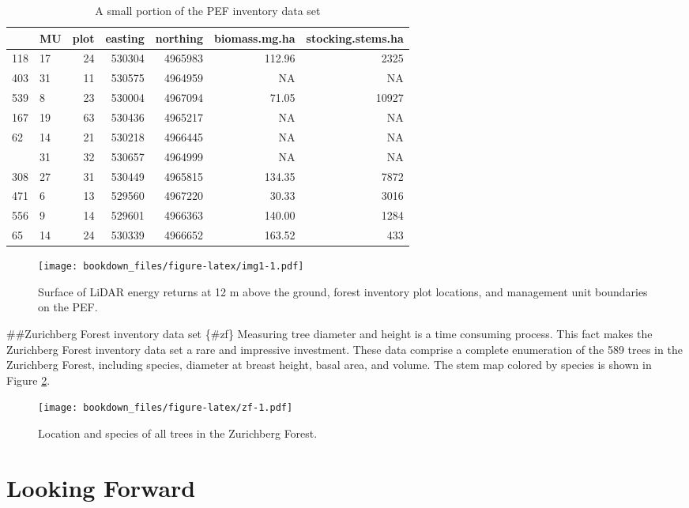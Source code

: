 \documentclass[]{krantz}
\begin{document}
\begin{table}[t]

\caption{\label{tab:pef}A small portion of the PEF inventory data set}
\centering
\begin{tabular}{llrrrrr}
\toprule
  & MU & plot & easting & northing & biomass.mg.ha & stocking.stems.ha\\
\midrule
118 & 17 & 24 & 530304 & 4965983 & 112.96 & 2325\\
403 & 31 & 11 & 530575 & 4964959 & NA & NA\\
539 & 8 & 23 & 530004 & 4967094 & 71.05 & 10927\\
167 & 19 & 63 & 530436 & 4965217 & NA & NA\\
62 & 14 & 21 & 530218 & 4966445 & NA & NA\\
\addlinespace
410 & 31 & 32 & 530657 & 4964999 & NA & NA\\
308 & 27 & 31 & 530449 & 4965815 & 134.35 & 7872\\
471 & 6 & 13 & 529560 & 4967220 & 30.33 & 3016\\
556 & 9 & 14 & 529601 & 4966363 & 140.00 & 1284\\
65 & 14 & 24 & 530339 & 4966652 & 163.52 & 433\\
\bottomrule
\end{tabular}
\end{table}

\begin{figure}
\centering
\texttt{[image: bookdown\_files/figure-latex/img1-1.pdf]}
\caption{\label{fig:img1}Surface of LiDAR energy returns at 12 m above the ground, forest inventory plot locations, and management unit boundaries on the PEF.}
\end{figure}

\#\#Zurichberg Forest inventory data set \{\#zf\}
Measuring tree diameter and height is a time consuming process. This fact makes the Zurichberg Forest inventory data set a rare and impressive investment. These data comprise a complete enumeration of the 589 trees in the Zurichberg Forest, including species, diameter at breast height, basal area, and volume. The stem map colored by species is shown in Figure \ref{fig:zf}.

\begin{figure}
\centering
\texttt{[image: bookdown\_files/figure-latex/zf-1.pdf]}
\caption{\label{fig:zf}Location and species of all trees in the Zurichberg Forest.}
\end{figure}

\hypertarget{looking-forward}{%
\section{Looking Forward}\label{looking-forward}}
\end{document}
